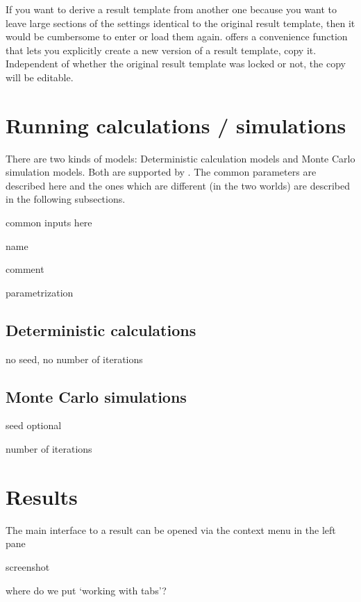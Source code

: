 If you want to derive a result template from another one because you want to leave large sections of the settings identical to the original result template, then it would be cumbersome to enter or load them again. \RA{} offers a convenience function that lets you explicitly create a new version of a result template, \ie copy it. Independent of whether the original result template was locked or not, the copy will be editable.



\section{Running calculations / simulations}
\label{sec:riskAnalyticsSimulation}

There are two kinds of models: Deterministic calculation models and Monte Carlo simulation models. Both are supported by \RA. The common parameters are described here and the ones which are different (in the two worlds) are described in the following subsections.

common inputs here

name

comment

parametrization



\subsection{Deterministic calculations}
\label{subsec:deterministicCalculations}

no seed, no number of iterations


\subsection{Monte Carlo simulations}
\label{subsec:simulations}

seed optional

number of iterations


\section{Results}
\label{sec:riskAnalyticsResults}

The main interface to a result can be opened via the context menu in the left pane  

screenshot



where do we put `working with tabs'?
